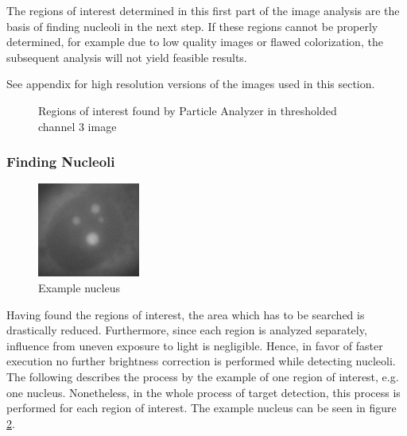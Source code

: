 \documentclass[a4paper, 12pt, twoside]{article}
\begin{document}
The regions of interest determined in this first part of the image analysis are
the basis of finding nucleoli in the next step. If these regions cannot be
properly determined, for example due to low quality images or flawed
colorization, the subsequent analysis will not yield feasible results.

See appendix for high resolution versions of the images used in this section.

\begin{figure}[h]
\centering
{}
\caption{Regions of interest found by Particle Analyzer in thresholded channel 3
image}
\label{fig:channel3_rois}
\end{figure}

\subsubsection{Finding Nucleoli}

\begin{figure}
\vspace{-14pt}
\includegraphics[width=0.3\textwidth]{images/example_nucleus}
\caption{Example nucleus}
\label{fig:example_nucleus}
\vspace{-28pt}
\end{figure}
Having found the regions of interest, the area which has to be searched is
drastically reduced. Furthermore, since each region is analyzed separately,
influence from uneven exposure to light is negligible. Hence, in favor of
faster execution no further brightness correction is performed while detecting
nucleoli. The following describes the process by the example of one region of
interest, e.g. one nucleus. Nonetheless, in the whole process of target
detection, this process is performed for each region of interest. The example
nucleus can be seen in figure \ref{fig:example_nucleus}.
\end{document}
